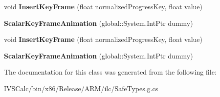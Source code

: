 \begin{DoxyCompactItemize}
void {\bfseries Insert\+Key\+Frame} (float normalized\+Progress\+Key, float value)
\item 
\mbox{\label{class_windows_1_1_u_i_1_1_composition_1_1_scalar_key_frame_animation_ac678541f06dcd40c8be38e67f6ad159c}} 
{\bfseries Scalar\+Key\+Frame\+Animation} (global\+::\+System.\+Int\+Ptr dummy)
\item 
\mbox{\label{class_windows_1_1_u_i_1_1_composition_1_1_scalar_key_frame_animation_aa0a1dc6d180b2677e4c2daef373bf006}} 
void {\bfseries Insert\+Key\+Frame} (float normalized\+Progress\+Key, float value)
\item 
\mbox{\label{class_windows_1_1_u_i_1_1_composition_1_1_scalar_key_frame_animation_ac678541f06dcd40c8be38e67f6ad159c}} 
{\bfseries Scalar\+Key\+Frame\+Animation} (global\+::\+System.\+Int\+Ptr dummy)
\end{DoxyCompactItemize}


The documentation for this class was generated from the following file\+:\begin{DoxyCompactItemize}
\item 
I\+V\+S\+Calc/bin/x86/\+Release/\+A\+R\+M/ilc/Safe\+Types.\+g.\+cs\end{DoxyCompactItemize}
